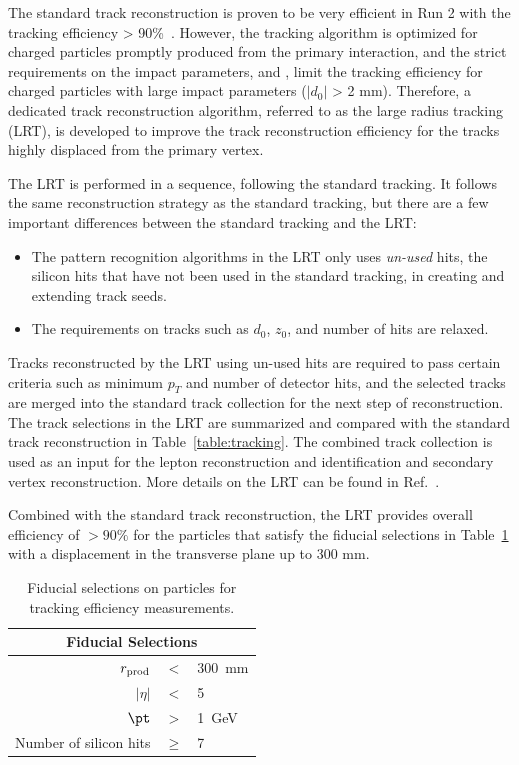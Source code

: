 The standard track reconstruction is proven to be very efficient in Run 2 with the tracking efficiency > 90\%~\cite{Aaboud:2017all}. However, the tracking algorithm is optimized for charged particles promptly produced from the primary interaction, and the strict requirements on the impact parameters, \dzero and \zzero, limit the tracking efficiency for charged particles with large impact parameters ($|d_{0}|$ > 2 mm). Therefore, a dedicated track reconstruction algorithm, referred to as the large radius tracking (LRT), is developed to improve the track reconstruction efficiency for the tracks highly displaced from the primary vertex.

The LRT is performed in a sequence, following the standard tracking. It follows the same reconstruction strategy as the standard tracking, but there are a few important differences between the standard tracking and the LRT:

\begin{itemize}
	\item The pattern recognition algorithms in the LRT only uses \textit{un-used} hits, the silicon hits that have not been used in the standard tracking, in creating and extending track seeds.
	\item The requirements on tracks such as $d_{0}$, $z_{0}$, and number of hits are relaxed.
\end{itemize}

Tracks reconstructed by the LRT using un-used hits are required to pass certain criteria such as minimum $p_{T}$ and number of detector hits, and the selected tracks are merged into the standard track collection for the next step of reconstruction. The track selections in the LRT are summarized and compared with the standard track reconstruction in Table~\ref{table:tracking}. The combined track collection is used as an input for the lepton reconstruction and identification and secondary vertex reconstruction. More details on the LRT can be found in Ref.~\cite{ATL-PHYS-PUB-2017-014}.

Combined with the standard track reconstruction, the LRT provides overall efficiency of $> 90\%$ for the particles that satisfy the fiducial selections in Table~\ref{table:TechEffTable} with a displacement in the transverse plane up to 300 \si{\milli\meter}.

\begin{table}[!htb]
\centering
\begin{tabular}{ r c l }
 \hline
 \hline
  \multicolumn{3}{c}{Fiducial Selections}  \\
 \hline
 $r_{\rm prod}$ & $<$ & 300~mm \\
$|\eta|$ & $<$ & 5 \\
 $\pt$ & $>$ & 1~GeV  \\
 Number of silicon hits & $\ge$ & 7  \\
\hline
\hline
\end{tabular}
\caption{Fiducial selections on particles for tracking efficiency measurements.}
\label{table:TechEffTable}
\end{table}


